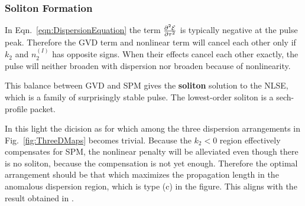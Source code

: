 \documentclass[%
 reprint,
 amsmath,amssymb,
 aps,
]{revtex4-2}
\begin{document}
\subsubsection{Soliton Formation}
In Eqn.~\ref{eqn:DispersionEquation} the term 
$\pdv[2]{\mathcal{E}}{\tau}$ is typically negative 
at the pulse peak. Therefore 
the GVD term and nonlinear term will cancel each other 
only if $k_2$ and $n_2^{(I)}$ has opposite signs. 
When their effects cancel each other exactly, 
the pulse will neither broaden with dispersion 
nor broaden because of nonlinearity. 
\par
This balance between GVD and SPM gives the 
\textbf{soliton} solution to the NLSE, 
which is a family of surprisingly stable pulse. 
The lowest-order soliton is a sech-profile packet. 
\cite{mollenauer_solitons_2006}
\par
In this light the dicision as for 
which among the three dispersion arrangements 
in Fig.~\ref{fig:ThreeDMaps} becomes trivial. 
Because the $k_2<0$ region effectively 
compensates for SPM, the nonlinear penalty 
will be alleviated even though there is no soliton, 
because the compensation is not yet enough. 
Therefore the optimal arrangement should be that which 
maximizes the propagation length in the anomalous 
dispersion region, which is type (c) in the figure. 
This aligns with the result 
obtained in \cite{taga_performance_1994}.
\end{document}
